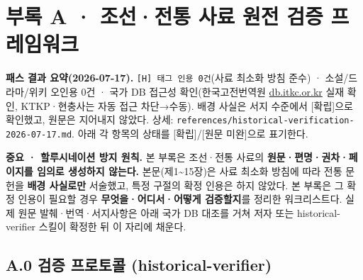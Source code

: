 \documentclass[12pt,oneside]{book}
\newenvironment{authnote}
  {\par\smallskip\begingroup\leftskip=6mm\rightskip=3mm\small\color{muted}\noindent\ignorespaces}
  {\par\endgroup\smallskip}
\begin{document}

\chapter*{부록 A · 조선·전통 사료 원전 검증 프레임워크}

\begin{authnote}\textbf{패스 결과 요약(2026-07-17).} \texttt{[H] 태그 인용 0건}(사료 최소화 방침 준수) · 소설/드라마/위키 오인용 0건 · 국가 DB 접근성 확인(한국고전번역원 \url{db.itkc.or.kr} 실재 확인, KTKP·현충사는 자동 접근 차단→수동). 배경 사실은 서지 수준에서 [확립]으로 확인했고, 원문은 지어내지 않았다. 상세: \texttt{references/historical-verification-2026-07-17.md}. 아래 각 항목의 상태를 [확립]/[원문 미완]으로 표기한다.\end{authnote}

\begin{authnote}\textbf{중요 · 할루시네이션 방지 원칙.} 본 부록은 조선·전통 사료의 \textbf{원문·편명·권차·페이지를 임의로 생성하지 않는다.} 본문(제1\textasciitilde{}15장)은 사료 최소화 방침에 따라 전통 문헌을 \textbf{배경 사실로만} 서술했고, 특정 구절의 확정 인용은 하지 않았다. 본 부록은 그 확정 인용이 필요할 경우 \textbf{무엇을·어디서·어떻게 검증할지}를 정리한 워크리스트다. 실제 원문 발췌·번역·서지사항은 아래 국가 DB 대조를 거쳐 저자 또는 historical-verifier 스킬이 확정한 뒤 이 자리에 채운다.\end{authnote}

\section{A.0 검증 프로토콜 (historical-verifier)}
\end{document}

